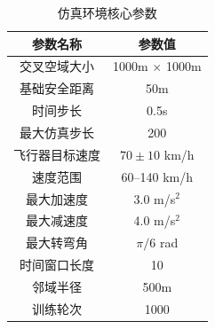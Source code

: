 \documentclass[12pt,a4paper,UTF8]{ctexart}
\begin{document}
\begin{table}[H]
    \centering
    \caption{仿真环境核心参数}
    \label{tab:env_params}
    \begin{tabular}{|c|c|}
        \hline
        参数名称 & 参数值 \\
        \hline
        交叉空域大小 & 1000m $\times$ 1000m \\
        基础安全距离 & 50m \\
        时间步长 & 0.5s \\
        最大仿真步长 & 200 \\
        飞行器目标速度 & $70 \pm 10$ km/h \\
        速度范围 & 60--140 km/h \\
        最大加速度 & 3.0 m/s$^2$ \\
        最大减速度 & 4.0 m/s$^2$ \\
        最大转弯角 & $\pi/6$ rad \\
        时间窗口长度 & 10 \\
        邻域半径 & 500m \\
        训练轮次 & 1000 \\
        \hline
    \end{tabular}
\end{table}
\end{document}
